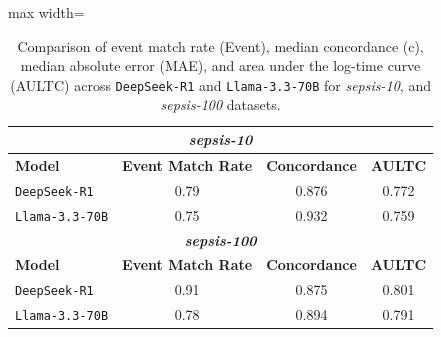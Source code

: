 \begin{table}[htbp]
\caption{Comparison of event match rate (Event), median concordance (c), median absolute error (MAE), and area under the log-time curve (AULTC) across \texttt{DeepSeek-R1} and \texttt{Llama-3.3-70B} for \textit{sepsis-10}, and \textit{sepsis-100} datasets.}
\ChSevenTableBodyStart
\begin{ChSevenFloatBody}

\centering
\begin{adjustbox}{max width=\columnwidth}
\setlength{\tabcolsep}{4.5pt} %
\renewcommand{\arraystretch}{1.1}

\begin{tabular}{lccc}
\hline
\multicolumn{4}{c}{\textbf{\textit{sepsis-10}}} \\
\hline
\textbf{Model} & \textbf{Event Match Rate} & \textbf{Concordance} & \textbf{AULTC} \\
\texttt{DeepSeek-R1}      & 0.79 & 0.876 & 0.772 \\
\texttt{Llama-3.3-70B}    & 0.75 & 0.932 & 0.759 \\
\hline
\multicolumn{4}{c}{\textbf{\textit{sepsis-100}}} \\
\hline
\textbf{Model} & \textbf{Event Match Rate} & \textbf{Concordance} & \textbf{AULTC} \\
\texttt{DeepSeek-R1}      & 0.91 & 0.875 & 0.801 \\
\texttt{Llama-3.3-70B}    & 0.78 & 0.894 & 0.791 \\
\hline
\end{tabular}
\end{adjustbox}



\end{ChSevenFloatBody}
\end{table}